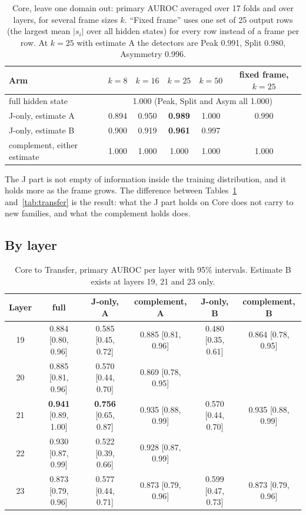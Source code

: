 \documentclass[11pt,a4paper]{article}
\begin{document}
\begin{table}[H]
\centering\small
\begin{tabular}{@{}lccccc@{}}
\toprule
Arm & $k=8$ & $k=16$ & $k=25$ & $k=50$ & fixed frame, $k=25$ \\
\midrule
full hidden state & \multicolumn{5}{c}{1.000 (Peak, Split and Asym all 1.000)} \\
J-only, estimate A & 0.894 & 0.950 & \textbf{0.989} & 1.000 & 0.990 \\
J-only, estimate B & 0.900 & 0.919 & \textbf{0.961} & 0.997 & \\
complement, either estimate & 1.000 & 1.000 & 1.000 & 1.000 & 1.000 \\
\bottomrule
\end{tabular}
\caption{Core, leave one domain out: primary AUROC averaged over 17 folds and over layers, for several frame sizes $k$. ``Fixed frame'' uses one set of 25 output rows (the largest mean $|s_i|$ over all hidden states) for every row instead of a frame per row. At $k=25$ with estimate A the detectors are Peak 0.991, Split 0.980, Asymmetry 0.996.}
\label{tab:core}
\end{table}

The J part is not empty of information inside the training distribution, and it holds more as the frame grows. The difference between Tables~\ref{tab:core} and~\ref{tab:transfer} is the result: what the J part holds on Core does not carry to new families, and what the complement holds does.

\subsection{By layer}

\begin{table}[H]
\centering\small
\begin{tabular}{@{}cccccc@{}}
\toprule
Layer & full & J-only, A & complement, A & J-only, B & complement, B \\
\midrule
19 & 0.884 [0.80, 0.96] & 0.585 [0.45, 0.72] & 0.885 [0.81, 0.96] & 0.480 [0.35, 0.61] & 0.864 [0.78, 0.95] \\
20 & 0.885 [0.81, 0.96] & 0.570 [0.44, 0.70] & 0.869 [0.78, 0.95] & & \\
21 & \textbf{0.941} [0.89, 1.00] & \textbf{0.756} [0.65, 0.87] & 0.935 [0.88, 0.99] & 0.570 [0.44, 0.70] & 0.935 [0.88, 0.99] \\
22 & 0.930 [0.87, 0.99] & 0.522 [0.39, 0.66] & 0.928 [0.87, 0.99] & & \\
23 & 0.873 [0.79, 0.96] & 0.577 [0.44, 0.71] & 0.873 [0.79, 0.96] & 0.599 [0.47, 0.73] & 0.873 [0.79, 0.96] \\
\bottomrule
\end{tabular}
\caption{Core to Transfer, primary AUROC per layer with 95\% intervals. Estimate B exists at layers 19, 21 and 23 only.}
\label{tab:layers}
\end{table}
\end{document}
